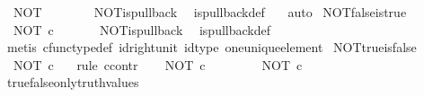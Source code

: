 \begin{isabellebody}
\ \ {\isachardoublequoteopen}NOT\ {\isacharcolon}{\kern0pt}\ {\isasymOmega}\ {\isasymrightarrow}\ {\isasymOmega}{\isachardoublequoteclose}\isanewline
%
\isadelimproof
\ \ %
\endisadelimproof
%
\isatagproof
{}\isamarkupfalse%
\ NOT{\isacharunderscore}{\kern0pt}is{\isacharunderscore}{\kern0pt}pullback\ \isamarkupfalse%
\ is{\isacharunderscore}{\kern0pt}pullback{\isacharunderscore}{\kern0pt}def\ \ \isamarkupfalse%
\ auto%
\endisatagproof
{\isafoldproof}%
%
\isadelimproof
\isanewline
%
\endisadelimproof
\isanewline
{}\isamarkupfalse%
\ NOT{\isacharunderscore}{\kern0pt}false{\isacharunderscore}{\kern0pt}is{\isacharunderscore}{\kern0pt}true{\isacharcolon}{\kern0pt}\isanewline
\ \ {\isachardoublequoteopen}NOT\ {\isasymcirc}\isactrlsub c\ {\isasymf}\ {\isacharequal}{\kern0pt}\ {\isasymt}{\isachardoublequoteclose}\isanewline
%
\isadelimproof
\ \ %
\endisadelimproof
%
\isatagproof
{}\isamarkupfalse%
\ NOT{\isacharunderscore}{\kern0pt}is{\isacharunderscore}{\kern0pt}pullback\ \isamarkupfalse%
\ is{\isacharunderscore}{\kern0pt}pullback{\isacharunderscore}{\kern0pt}def\ \isanewline
\ \ \isamarkupfalse%
\ {\isacharparenleft}{\kern0pt}metis\ cfunc{\isacharunderscore}{\kern0pt}type{\isacharunderscore}{\kern0pt}def\ id{\isacharunderscore}{\kern0pt}right{\isacharunderscore}{\kern0pt}unit\ id{\isacharunderscore}{\kern0pt}type\ one{\isacharunderscore}{\kern0pt}unique{\isacharunderscore}{\kern0pt}element{\isacharparenright}{\kern0pt}%
\endisatagproof
{\isafoldproof}%
%
\isadelimproof
\isanewline
%
\endisadelimproof
\isanewline
{}\isamarkupfalse%
\ NOT{\isacharunderscore}{\kern0pt}true{\isacharunderscore}{\kern0pt}is{\isacharunderscore}{\kern0pt}false{\isacharcolon}{\kern0pt}\isanewline
\ \ {\isachardoublequoteopen}NOT\ {\isasymcirc}\isactrlsub c\ {\isasymt}\ {\isacharequal}{\kern0pt}\ {\isasymf}{\isachardoublequoteclose}\isanewline
%
\isadelimproof
%
\endisadelimproof
%
\isatagproof
{}\isamarkupfalse%
{\isacharparenleft}{\kern0pt}rule\ ccontr{\isacharparenright}{\kern0pt}\isanewline
\ \ \isamarkupfalse%
\ {\isachardoublequoteopen}NOT\ {\isasymcirc}\isactrlsub c\ {\isasymt}\ {\isasymnoteq}\ {\isasymf}{\isachardoublequoteclose}\isanewline
\ \ \isamarkupfalse%
\ \isamarkupfalse%
\ {\isachardoublequoteopen}NOT\ {\isasymcirc}\isactrlsub c\ {\isasymt}\ {\isacharequal}{\kern0pt}\ {\isasymt}{\isachardoublequoteclose}\isanewline
\ \ \ \ \isamarkupfalse%
\ true{\isacharunderscore}{\kern0pt}false{\isacharunderscore}{\kern0pt}only{\isacharunderscore}{\kern0pt}truth{\isacharunderscore}{\kern0pt}values\ \isamarkupfalse%

\end{isabellebody}
